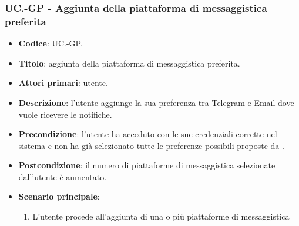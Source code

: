 	\subsubsection{UC\theuccount.\thesubuccount-GP - Aggiunta della piattaforma di messaggistica preferita}

		\begin{itemize}
			\item \textbf{Codice}: UC\theuccount.\thesubuccount-GP.
			\item \textbf{Titolo}: aggiunta della piattaforma di messaggistica preferita.
			\item \textbf{Attori primari}: utente.
			\item \textbf{Descrizione}: l’utente aggiunge la sua preferenza tra Telegram e Email dove vuole ricevere le notifiche.
			\item \textbf{Precondizione}: l’utente ha acceduto con le sue credenziali corrette nel sistema e non ha già selezionato tutte le preferenze possibili proposte da \progetto.
			\item \textbf{Postcondizione}: il numero di piattaforme di messaggistica selezionate dall’utente è aumentato.
			\item \textbf{Scenario principale}:
			\begin{enumerate}
				\item L'utente procede all'aggiunta di una o più piattaforme di messaggistica
			\end{enumerate}
		\end{itemize}


